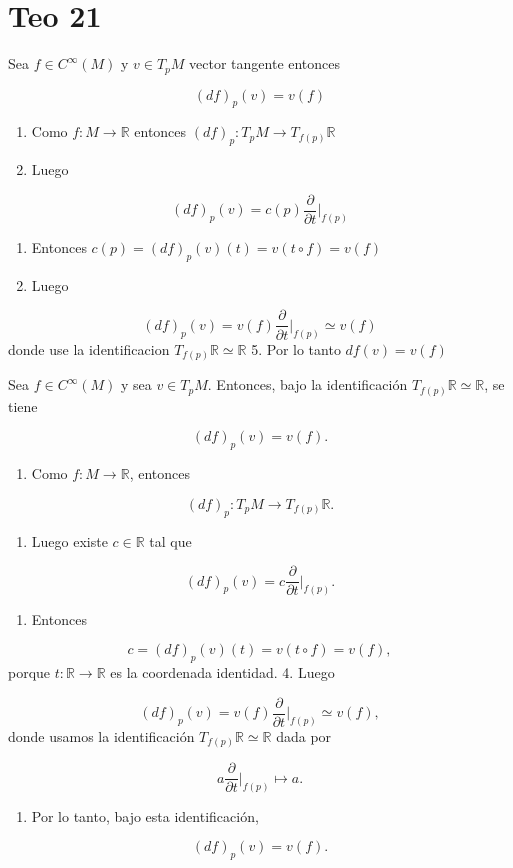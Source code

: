 \section{Teo 21}
\begin{bookremark}{}
Sea $f\in C^{\infty}(M)$ y $v\in T_{p}M$ vector tangente entonces

\[
(df)_{p}(v)=v(f)
\]
\end{bookremark}
\begin{bookproof}{}
\begin{enumerate}
\item Como $f:M\rightarrow\mathbb{R}$ entonces $(df)_{p}:T_{p}M\rightarrow T_{f(p)}\mathbb{R}$
\item Luego
\end{enumerate}
\[
(df)_{p}(v)=c(p)\frac{\partial}{\partial t}|_{f(p)}
\]
\begin{enumerate}[start=3]
\item Entonces $c(p)=(df)_{p}(v)(t)=v(t\circ f)=v(f)$
\item Luego
\end{enumerate}
\[
(df)_{p}(v)=v(f)\frac{\partial}{\partial t}|_{f(p)}\simeq v(f)
\]
donde use la identificacion $T_{f(p)}\mathbb{R}\simeq \mathbb{R}$ 5. Por lo tanto $df(v)=v(f)$

\bookqed
\end{bookproof}
\begin{bookremark}{}
Sea $f\in C^{\infty}(M)$ y sea $v\in T_pM$. Entonces, bajo la identificación $T_{f(p)}\mathbb R\simeq \mathbb R$, se tiene

\[
(df)_p(v)=v(f).
\]
\end{bookremark}
\begin{bookproof}{}
\begin{enumerate}
\item Como $f:M\rightarrow\mathbb{R}$, entonces
\end{enumerate}
\[
(df)_p:T_pM\rightarrow T_{f(p)}\mathbb{R}.
\]
\begin{enumerate}[start=2]
\item Luego existe $c\in\mathbb R$ tal que
\end{enumerate}
\[
(df)_p(v)=c\frac{\partial}{\partial t}\bigg|_{f(p)}.
\]
\begin{enumerate}[start=3]
\item Entonces
\end{enumerate}
\[
c=(df)_p(v)(t)=v(t\circ f)=v(f),
\]
porque $t:\mathbb R\to\mathbb R$ es la coordenada identidad. 4. Luego

\[
(df)_p(v)=v(f)\frac{\partial}{\partial t}\bigg|_{f(p)}\simeq v(f),
\]
donde usamos la identificación $T_{f(p)}\mathbb{R}\simeq \mathbb{R}$ dada por

\[
a\frac{\partial}{\partial t}\bigg|_{f(p)}\mapsto a.
\]
\begin{enumerate}[start=5]
\item Por lo tanto, bajo esta identificación,
\end{enumerate}
\[
(df)_p(v)=v(f).
\]
\bookqed
\end{bookproof}
